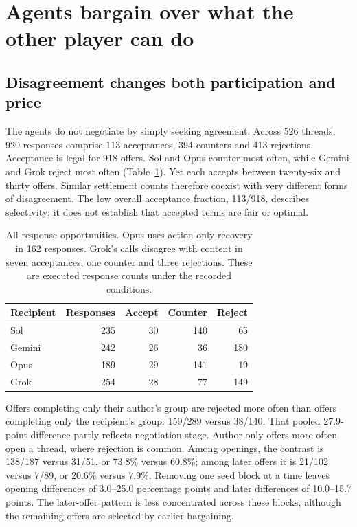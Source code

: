 \section{Agents bargain over what the other player can do}
\label{sec:bargaining}

\subsection{Disagreement changes both participation and price}

The agents do not negotiate by simply seeking agreement. Across 526 threads, 920 responses comprise 113 acceptances, 394 counters and 413 rejections. Acceptance is legal for 918 offers. Sol and Opus counter most often, while Gemini and Grok reject most often (Table~\ref{tab:responses}). Yet each accepts between twenty-six and thirty offers. Similar settlement counts therefore coexist with very different forms of disagreement. The low overall acceptance fraction, 113/918, describes selectivity; it does not establish that accepted terms are fair or optimal.

\begin{table}[t]\centering\small
\begin{tabular}{@{}lrrrr@{}}\toprule
Recipient & Responses & Accept & Counter & Reject\\\midrule
Sol &235&30&140&65\\
Gemini &242&26&36&180\\
Opus &189&29&141&19\\
Grok &254&28&77&149\\\bottomrule
\end{tabular}
\caption{All response opportunities. Opus uses action-only recovery in 162 responses. Grok's calls disagree with content in seven acceptances, one counter and three rejections. These are executed response counts under the recorded conditions.}
\label{tab:responses}\end{table}

Offers completing only their author's group are rejected more often than offers completing only the recipient's group: 159/289 versus 38/140. That pooled 27.9-point difference partly reflects negotiation stage. Author-only offers more often open a thread, where rejection is common. Among openings, the contrast is 138/187 versus 31/51, or 73.8\% versus 60.8\%; among later offers it is 21/102 versus 7/89, or 20.6\% versus 7.9\%. Removing one seed block at a time leaves opening differences of 3.0--25.0 percentage points and later differences of 10.0--15.7 points. The later-offer pattern is less concentrated across these blocks, although the remaining offers are selected by earlier bargaining.

